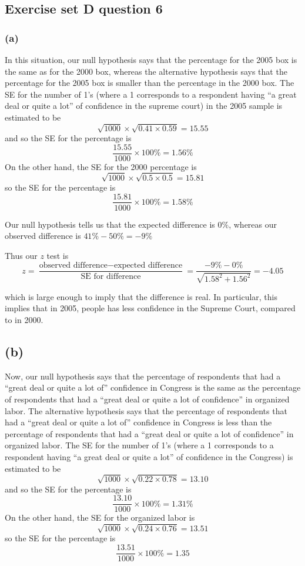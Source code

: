 \documentclass[11pt]{article}
\begin{document}
\subsection*{Exercise set D question 6} %
\subsubsection*{(a)}
\noindent In this situation, our null hypothesis says that the percentage for the 2005 box is the same as for the 2000 box, whereas the alternative hypothesis says that the percentage for the 2005 box is smaller than the percentage in the 2000 box. The SE for the number of 1's (where a 1 corresponds to a respondent having ``a great deal or quite a lot'' of confidence in the supreme court) in the 2005 sample is estimated to be
$$\sqrt{1000} \times \sqrt{0.41 \times 0.59} = 15.55$$
\noindent and so the SE for the percentage is
$$\frac{15.55}{1000} \times 100\% = 1.56\%$$
\noindent On the other hand, the SE for the 2000 percentage is
$$\sqrt{1000} \times \sqrt{0.5 \times 0.5} = 15.81$$
\noindent so the SE for the percentage is
$$\frac{15.81}{1000} \times 100\% = 1.58\%$$

\noindent Our null hypothesis tells us that the expected difference is $0\%$, whereas our observed difference is $41\% - 50\% = -9\%$

\noindent Thus our $z$ test is
$$z = \frac{\text{observed difference} - \text{expected difference}}{\text{SE for difference}} = \frac{ - 9\% - 0\%}{\sqrt{1.58^2 + 1.56^2}} = -4.05$$

\noindent which is large enough to imply that the difference is real. In particular, this implies that in 2005, people has less confidence in the Supreme Court, compared to in 2000.


\subsection*{(b)}
\noindent Now, our null hypothesis says that the percentage of respondents that had a ``great deal or quite a lot of''  confidence in Congress is the same as the percentage of respondents that had a ``great deal or quite a lot of confidence'' in organized labor. The alternative hypothesis says that the percentage of respondents that had a ``great deal or quite a lot of''  confidence in Congress is less than the percentage of respondents that had a ``great deal or quite a lot of confidence'' in organized labor. The SE for the number of 1's (where a 1 corresponds to a respondent having ``a great deal or quite a lot'' of confidence in the Congress) is estimated to be
$$\sqrt{1000} \times \sqrt{0.22 \times 0.78} = 13.10$$
\noindent and so the SE for the percentage is
$$\frac{13.10}{1000} \times 100\% = 1.31\%$$
\noindent On the other hand, the SE for the organized labor is
$$\sqrt{1000} \times \sqrt{0.24 \times 0.76} = 13.51$$
\noindent so the SE for the percentage is
$$\frac{13.51}{1000} \times 100\% = 1.35$$
\end{document}
